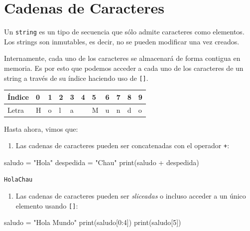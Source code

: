 \documentclass[
  letterpaper,
  DIV=11,
  numbers=noendperiod]{scrreprt}
\newenvironment{Shaded}{\begin{snugshade}}{\end{snugshade}}
\newcommand{\BuiltInTok}[1]{\textcolor[rgb]{0.00,0.23,0.31}{#1}}
\newcommand{\DecValTok}[1]{\textcolor[rgb]{0.68,0.00,0.00}{#1}}
\newcommand{\NormalTok}[1]{\textcolor[rgb]{0.00,0.23,0.31}{#1}}
\newcommand{\OperatorTok}[1]{\textcolor[rgb]{0.37,0.37,0.37}{#1}}
\newcommand{\StringTok}[1]{\textcolor[rgb]{0.13,0.47,0.30}{#1}}
\providecommand{\tightlist}{%
  \setlength{\itemsep}{0pt}\setlength{\parskip}{0pt}}\usepackage{longtable,booktabs,array}
\begin{document}
\section{Cadenas de Caracteres}\label{cadenas-de-caracteres}

Un \texttt{string} es un tipo de secuencia que sólo admite caracteres
como elementos. Los strings son inmutables, es decir, no se pueden
modificar una vez creados.

Internamente, cada uno de los caracteres se almacenará de forma contigua
en memoria. Es por esto que podemos acceder a cada uno de los caracteres
de un string a través de su índice haciendo uso de \texttt{{[}{]}}.

\begin{longtable}[]{@{}lllllllllll@{}}
\toprule\noalign{}
Índice & 0 & 1 & 2 & 3 & 4 & 5 & 6 & 7 & 8 & 9 \\
\midrule\noalign{}
\endhead
\bottomrule\noalign{}
\endlastfoot
Letra & H & o & l & a & & M & u & n & d & o \\
\end{longtable}

Hasta ahora, vimos que:

\begin{enumerate}
\def\labelenumi{\arabic{enumi}.}
\tightlist
\item
  Las cadenas de caracteres pueden ser concatenadas con el operador
  \texttt{+}:
\end{enumerate}

\begin{Shaded}
\begin{Highlighting}[]
\NormalTok{saludo }\OperatorTok{=} \StringTok{"Hola"}
\NormalTok{despedida }\OperatorTok{=} \StringTok{"Chau"}
\BuiltInTok{print}\NormalTok{(saludo }\OperatorTok{+}\NormalTok{ despedida)}
\end{Highlighting}
\end{Shaded}

\begin{verbatim}
HolaChau
\end{verbatim}

\begin{enumerate}
\def\labelenumi{\arabic{enumi}.}
\setcounter{enumi}{1}
\tightlist
\item
  Las cadenas de caracteres pueden ser \emph{sliceadas} o incluso
  acceder a un único elemento usando \texttt{{[}{]}}:
\end{enumerate}

\begin{Shaded}
\begin{Highlighting}[]
\NormalTok{saludo }\OperatorTok{=} \StringTok{"Hola Mundo"}
\BuiltInTok{print}\NormalTok{(saludo[}\DecValTok{0}\NormalTok{:}\DecValTok{4}\NormalTok{])}
\BuiltInTok{print}\NormalTok{(saludo[}\DecValTok{5}\NormalTok{])}
\end{Highlighting}
\end{Shaded}
\end{document}
